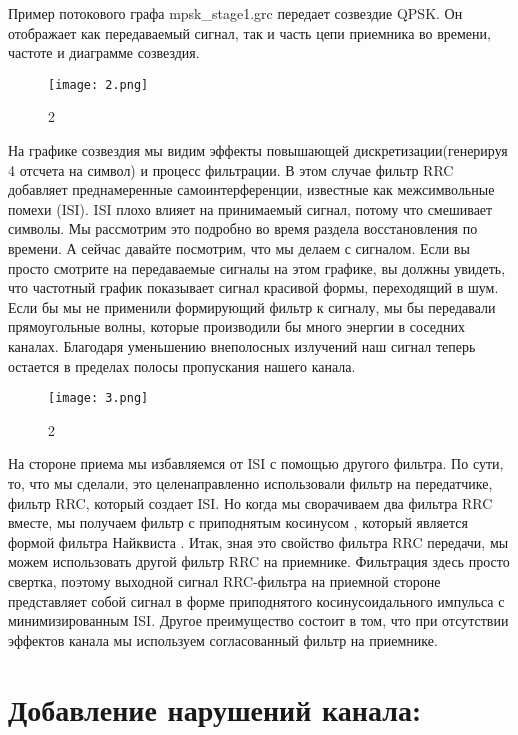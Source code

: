 \documentclass[10pt,a4paper,oneside]{article}
\begin{document}
Пример потокового графа mpsk_stage1.grc передает созвездие QPSK. Он отображает как передаваемый сигнал, так и часть цепи приемника во времени, частоте и диаграмме созвездия.

\begin{figure}[H]
        \centering
        \texttt{[image: 2.png]}
        \caption{2}
        \label{fig:first}
\end{figure}

На графике созвездия мы видим эффекты повышающей дискретизации(генерируя 4 отсчета на символ) и процесс фильтрации. В этом случае фильтр RRC добавляет преднамеренные самоинтерференции, известные как межсимвольные помехи (ISI). ISI плохо влияет на принимаемый сигнал, потому что смешивает символы. Мы рассмотрим это подробно во время раздела восстановления по времени. А сейчас давайте посмотрим, что мы делаем с сигналом. Если вы просто смотрите на передаваемые сигналы на этом графике, вы должны увидеть, что частотный график показывает сигнал красивой формы, переходящий в шум. Если бы мы не применили формирующий фильтр к сигналу, мы бы передавали прямоугольные волны, которые производили бы много энергии в соседних каналах. Благодаря уменьшению внеполосных излучений наш сигнал теперь остается в пределах полосы пропускания нашего канала.

\begin{figure}[H]
        \centering
        \texttt{[image: 3.png]}
        \caption{2}
        \label{fig:first}
\end{figure}

На стороне приема мы избавляемся от ISI с помощью другого фильтра. По сути, то, что мы сделали, это целенаправленно использовали фильтр на передатчике, фильтр RRC, который создает ISI. Но когда мы сворачиваем два фильтра RRC вместе, мы получаем фильтр с приподнятым косинусом , который является формой фильтра Найквиста . Итак, зная это свойство фильтра RRC передачи, мы можем использовать другой фильтр RRC на приемнике. Фильтрация здесь просто свертка, поэтому выходной сигнал RRC-фильтра на приемной стороне представляет собой сигнал в форме приподнятого косинусоидального импульса с минимизированным ISI. Другое преимущество состоит в том, что при отсутствии эффектов канала мы используем согласованный фильтр на приемнике.

\section{Добавление нарушений канала:}
\end{document}
